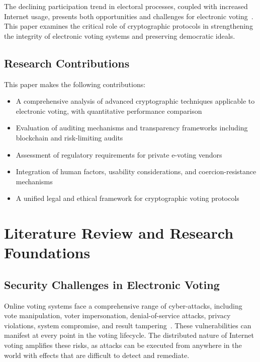 \documentclass[sigconf,nonacm]{acmart}
\begin{document}
The declining participation trend in electoral processes, coupled with increased Internet
usage, presents both opportunities and challenges for electronic voting~\cite{abramson1982decline}.
This paper examines the critical role of cryptographic protocols in strengthening the
integrity of electronic voting systems and preserving democratic ideals.

\subsection{Research Contributions}

This paper makes the following contributions:
\begin{itemize}
  \item A comprehensive analysis of advanced cryptographic techniques applicable to
        electronic voting, with quantitative performance comparison
  \item Evaluation of auditing mechanisms and transparency frameworks including
        blockchain and risk-limiting audits
  \item Assessment of regulatory requirements for private e-voting vendors
  \item Integration of human factors, usability considerations, and coercion-resistance
        mechanisms
  \item A unified legal and ethical framework for cryptographic voting protocols
\end{itemize}

\section{Literature Review and Research Foundations}

\subsection{Security Challenges in Electronic Voting}

Online voting systems face a comprehensive range of cyber-attacks, including vote
manipulation, voter impersonation, denial-of-service attacks, privacy violations, system
compromise, and result tampering~\cite{pran2007monitoring}. These vulnerabilities can
manifest at every point in the voting lifecycle. The distributed nature of Internet
voting amplifies these risks, as attacks can be executed from anywhere in the world with
effects that are difficult to detect and remediate.
\end{document}

